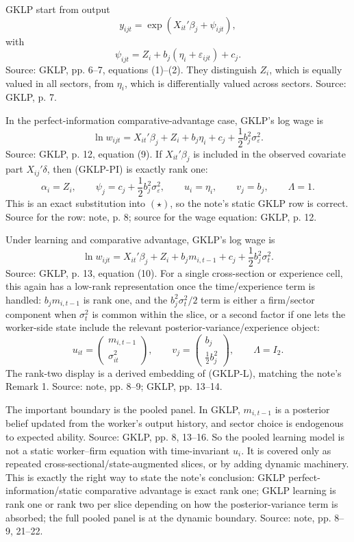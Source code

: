 \documentclass[11pt]{article}
\begin{document}
GKLP start from output
\[
y_{ijt}=\exp(X_{it}'\beta_j+\psi_{ijt}),
\]
with
\[
\psi_{ijt}=Z_i+b_j(\eta_i+\varepsilon_{ijt})+c_j.
\]
Source: GKLP, pp. 6--7, equations (1)--(2). They distinguish $Z_i$, which is equally
valued in all sectors, from $\eta_i$, which is differentially valued across sectors.
Source: GKLP, p. 7.

In the perfect-information comparative-advantage case, GKLP's log wage is
\[
\ln w_{ijt}=X_{it}'\beta_j+Z_i+b_j\eta_i+c_j+\frac{1}{2}b_j^2\sigma_\varepsilon^2.
\tag{GKLP-PI}
\]
Source: GKLP, p. 12, equation (9). If $X_{it}'\beta_j$ is included in the observed
covariate part $X_{ij}'\delta$, then (GKLP-PI) is exactly rank one:
\[
\alpha_i=Z_i,\qquad
\psi_j=c_j+\frac{1}{2}b_j^2\sigma_\varepsilon^2,\qquad
u_i=\eta_i,\qquad
v_j=b_j,\qquad
\Lambda=1.
\]
This is an exact substitution into $(\star)$, so the note's static GKLP row is correct.
Source for the row: note, p. 8; source for the wage equation: GKLP, p. 12.

Under learning and comparative advantage, GKLP's log wage is
\[
\ln w_{ijt}
=X_{it}'\beta_j+Z_i+b_jm_{i,t-1}+c_j+\frac{1}{2}b_j^2\sigma_t^2.
\tag{GKLP-L}
\]
Source: GKLP, p. 13, equation (10). For a single cross-section or experience cell,
this again has a low-rank representation once the time/experience term is handled:
$b_jm_{i,t-1}$ is rank one, and the $b_j^2\sigma_t^2/2$ term is either a firm/sector
component when $\sigma_t^2$ is common within the slice, or a second factor if one
lets the worker-side state include the relevant posterior-variance/experience object:
\[
u_{it}=
\begin{pmatrix}
m_{i,t-1}\\
\sigma_{it}^2
\end{pmatrix},
\qquad
v_j=
\begin{pmatrix}
b_j\\
\frac{1}{2}b_j^2
\end{pmatrix},
\qquad
\Lambda=I_2.
\]
The rank-two display is a derived embedding of (GKLP-L), matching the note's
Remark 1. Source: note, pp. 8--9; GKLP, pp. 13--14.

The important boundary is the pooled panel. In GKLP, $m_{i,t-1}$ is a posterior
belief updated from the worker's output history, and sector choice is endogenous to
expected ability. Source: GKLP, pp. 8, 13--16. So the pooled learning model is not a
static worker--firm equation with time-invariant $u_i$. It is covered only as repeated
cross-sectional/state-augmented slices, or by adding dynamic machinery. This is exactly
the right way to state the note's conclusion: GKLP perfect-information/static
comparative advantage is exact rank one; GKLP learning is rank one or rank two per
slice depending on how the posterior-variance term is absorbed; the full pooled panel is
at the dynamic boundary. Source: note, pp. 8--9, 21--22.
\end{document}
